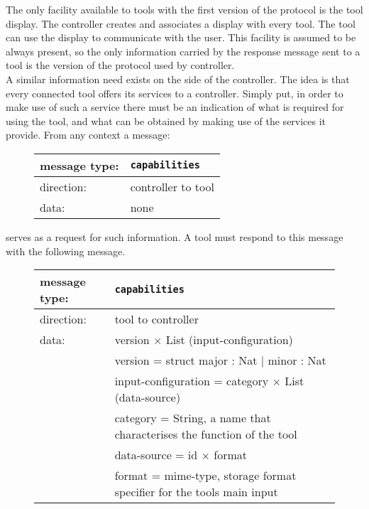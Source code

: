 \documentclass{article}
\newcommand{\msg}[1]{\texttt{#1}}
\begin{document}
   The only facility available to tools with the first version of the protocol
   is the tool display. The controller creates and associates a display with
   every tool. The tool can use the display to communicate with the user. This
   facility is assumed to be always present, so the only information carried by
   the response message sent to a tool is the version of the protocol used by
   controller.
   \\[4pt]
   A similar information need exists on the side of the controller. The idea is
   that every connected tool offers its services to a controller.  Simply put,
   in order to make use of such a service there must be an indication of what
   is required for using the tool, and what can be obtained by making use of the
   services it provide. From any
   context a message:
   
   \begin{figure}[H]
    \begin{tabular}{|ll|}
     \hline
      message type:   & \msg{capabilities} \\
     \hline
      direction:      & controller to tool \\
      data:           & none \\
     \hline
    \end{tabular}
   \end{figure}

   \noindent serves as a request for such information. A tool must respond to
   this message with  the following message.

   \begin{figure}[H]
    \begin{tabular}{|ll|}
     \hline
      message type:   & \msg{capabilities} \\
     \hline
      direction:      & tool to controller \\
      data:           & version $\times$ List (input-configuration) \\
                      &  version             = struct major : Nat $|$ minor : Nat \\
                      &  input-configuration = category $\times$ List (data-source) \\
                      &  category            = String,   a name that characterises the function of the tool \\
                      &  data-source         = id $\times$ format \\
                      &  format              = mime-type, storage format specifier for the tools main input \\
     \hline
    \end{tabular}
   \end{figure}
\end{document}
